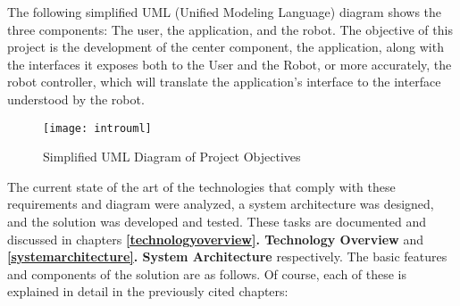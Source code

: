 The following simplified UML (Unified Modeling Language) diagram shows the three components: The user, the application, and the robot. The objective of this project is the development of the center component, the application, along with the interfaces it exposes both to the User and the Robot, or more accurately, the robot controller, which will translate the application's interface to the interface understood by the robot.
\begin{figure}[H]
\centering
\captionsetup{justification=centering}
\texttt{[image: introuml]}
\caption{Simplified UML Diagram of Project Objectives}
\end{figure}
\newpage
The current state of the art of the technologies that comply with these requirements and diagram were analyzed, a system 
architecture was designed, and the solution was developed and tested. These tasks are documented and discussed in chapters 
\textbf{\ref{technologyoverview}. Technology Overview} and \textbf{\ref{systemarchitecture}. System Architecture} 
respectively. The basic features and components of the solution are as follows. Of course, each of these is explained in 
detail in the previously cited chapters:
